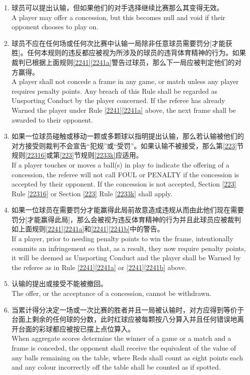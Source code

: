 \begin{enumerate}[label=(\alph*)]
    \item 球员可以提出认输，但如果他们的对手选择继续比赛那么其变得无效。\\
    A player may offer a concession, but this becomes null and void if their opponent chooses to play on.
    \item 球员不应在任何场或任何次比赛中认输一局除非任意球员需要罚分[才能获胜]。任何本规则的违反都应被视为所涉及的球员的违背体育精神的行为。如果裁判已根据上面规则\ref{2241}\ref{2241a}警告过球员，那么下一局应被判定他们的对方赢得。\\
    A player shall not concede a frame in any game, or match unless any player requires penalty points. Any breach of this Rule shall be regarded as Unsporting Conduct by the player concerned. If the referee has already Warned the player under Rule \ref{2241}\ref{2241a} above, the next frame shall be awarded to their opponent.
    \item \label{2242c}如果一位球员碰触或移动一颗或多颗球以指明提出认输，那么若认输被他们的对方接受则裁判不会宣告``犯规''或``受罚''。如果认输不被接受，那么第\ref{223}节规则\ref{22316}或第\ref{223}节规则\ref{2233k}应适用。\\
    If a player touches or moves a ball(s) in play to indicate the offering of a concession, the referee will not call FOUL or PENALTY if the concession is accepted by their opponent. If the concession is not accepted, Section \ref{223} Rule \ref{22316} or Section \ref{223} Rule \ref{2233k} shall apply.
    \item 如果一位球员在需要罚分才能赢得此局前故意造成违规从而由此他们现在需要罚分[才能赢得此局]，那么会被视为违反体育精神的行为并且此球员应被裁判如上面规则\ref{2241}\ref{2241a}和\ref{2241}\ref{2241b}中的警告。\\
    If a player, prior to needing penalty points to win the frame, intentionally commits an infringement so that, as a result, they now require penalty points, it will be deemed as Unsporting Conduct and the player shall be Warned by the referee as in Rule \ref{2241}\ref{2241a} or \ref{2241}\ref{2241b} above.
    \item 认输的提出或接受不能被撤回。\\
    The offer, or the acceptance of a concession, cannot be withdrawn.
    \item 当累计得分决定一场或一次比赛的胜者并且一局被认输时，对方应得到等价于台面上剩余的任何球的分数，此时红球应被每颗按八分算入并且任何错误地离开台面的彩球都应被按已摆上点位算入。\\
    When aggregate scores determine the winner of a game or a match and a frame is conceded, the opponent shall receive the equivalent of the value of any balls remaining on the table, where Reds shall count as eight points each and any colour incorrectly off the table shall be counted as if spotted.
\end{enumerate}

